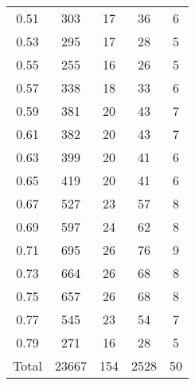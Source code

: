 \begin{table}[h!]
\begin{minipage}{\textwidth}
\begin{center}
\begin{tabular}{c|c|c|c|c}
0.51  & 303  & 17  & 36  & 6\\
0.53  & 295  & 17  & 28  & 5\\
0.55  & 255  & 16  & 26  & 5\\
0.57  & 338  & 18  & 33  & 6\\
0.59  & 381  & 20  & 43  & 7\\
0.61  & 382  & 20  & 43  & 7\\
0.63  & 399  & 20  & 41  & 6\\
0.65  & 419  & 20  & 41  & 6\\
0.67  & 527  & 23  & 57  & 8\\
0.69  & 597  & 24  & 62  & 8\\
0.71  & 695  & 26  & 76  & 9\\
0.73  & 664  & 26  & 68  & 8\\
0.75  & 657  & 26  & 68  & 8\\
0.77  & 545  & 23  & 54  & 7\\
0.79  & 271  & 16  & 28  & 5\\
\hline
Total  & 23667  & 154 & 2528 & 50 \\
\hline \hline
\end{tabular}


\end{center}
\end{minipage}
\end{table}
